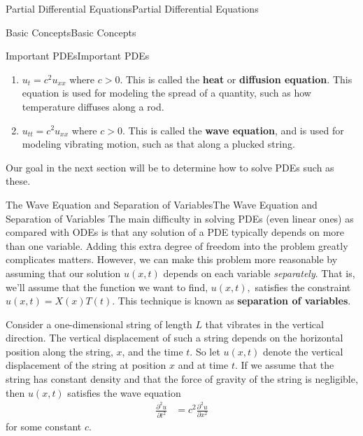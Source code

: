 \documentclass[10pt,]{book}
\newcommand{\terminology}[1]{\textbf{#1}}
\numberwithin{equation}{section}
\begin{document}
\begin{chapterptx}{Partial Differential Equations}{}{Partial Differential Equations}{}{}
\begin{sectionptx}{Basic Concepts}{}{Basic Concepts}{}{}
\begin{subsectionptx}{Important PDEs}{}{Important PDEs}{}{}
\begin{enumerate}
\item\hypertarget{li-23}{}\(u_{t} = c^{2}u_{xx}\) where \(c>0\). This is called the \terminology{heat} or \terminology{diffusion equation}. This equation is used for modeling the spread of a quantity, such as how temperature diffuses along a rod.%
\item\hypertarget{li-24}{}\(u_{tt} = c^{2}u_{xx}\) where \(c>0\). This is called the \terminology{wave equation}, and is used for modeling vibrating motion, such as that along a plucked string.%
\end{enumerate}
\hypertarget{p-450}{}%
Our goal in the next section will be to determine how to solve PDEs such as these.%
\end{subsectionptx}
\end{sectionptx}
%
%
\typeout{************************************************}
\typeout{************************************************}
%
\begin{sectionptx}{The Wave Equation and Separation of Variables}{}{The Wave Equation and Separation of Variables}{}{}\label{section-wave-equation-and-separation-of-variables}
\hypertarget{p-451}{}%
The main difficulty in solving PDEs (even linear ones) as compared with ODEs is that any solution of a PDE typically depends on more than one variable. Adding this extra degree of freedom into the problem greatly complicates matters. However, we can make this problem more reasonable by assuming that our solution \(u(x,t)\) depends on each variable \emph{separately}. That is, we'll assume that the function we want to find, \(u(x,t),\) satisfies the constraint \(u(x,t) = X(x)T(t)\). This technique is known as \terminology{separation of variables}.%
\par
\hypertarget{p-452}{}%
Consider a one-dimensional string of length \(L\) that vibrates in the vertical direction. The vertical displacement of such a string depends on the horizontal position along the string, \(x\), and the time \(t\). So let \(u(x,t)\) denote the vertical displacement of the string at position \(x\) and at time \(t\). If we assume that the string has constant density and that the force of gravity of the string is negligible, then \(u(x,t)\) satisfies the wave equation%
%
\begin{align}
\frac{\partial^{2}u}{\partial t^{2}} & = c^{2}\frac{\partial^{2}u}{\partial x^{2}} \label{equation-wave-equation}
\end{align}
\hypertarget{p-453}{}%
for some constant \(c\).%
\par

\end{sectionptx}
\end{chapterptx}
\end{document}
